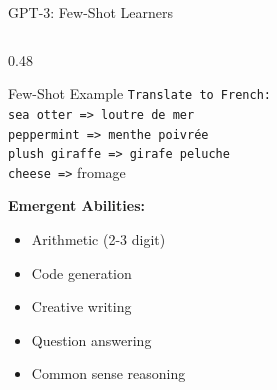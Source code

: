 \documentclass[aspectratio=169]{beamer}
\begin{document}
\begin{frame}{GPT-3: Few-Shot Learners 🚀}
\begin{columns}[T]
\begin{column}{0.48\textwidth}
\begin{exampleblock}{Few-Shot Example}
\tiny
\texttt{Translate to French:}\\
\texttt{sea otter => loutre de mer}\\
\texttt{peppermint => menthe poivrée}\\
\texttt{plush giraffe => girafe peluche}\\
\texttt{cheese =>} \alert{fromage}
\end{exampleblock}

\vspace{0.5em}

\textbf{Emergent Abilities:}
\begin{itemize}
    \item Arithmetic (2-3 digit)
    \item Code generation
    \item Creative writing
    \item Question answering
    \item Common sense reasoning
\end{itemize}
\end{column}
\end{columns}
\end{frame}
\end{document}
